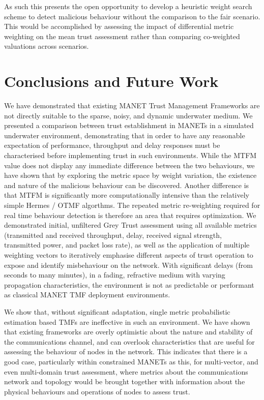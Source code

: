 As such this presents the open opportunity to develop a heuristic weight search scheme to detect malicious behaviour without the comparison to the fair scenario.
This would be accomplished by assessing the impact of differential metric weighting on the mean trust assessment rather than comparing co-weighted valuations across scenarios.


\section{Conclusions and Future Work}
We have demonstrated that existing MANET Trust Management Frameworks are not directly suitable to the sparse, noisy, and dynamic underwater medium.
We presented a comparison between trust establishment in MANETs in a simulated underwater environment, demonstrating that in order to have any reasonable expectation of performance, throughput and delay responses must be characterised before implementing trust in such environments. 
While the MTFM value does not display any immediate difference between the two behaviours, we have shown that by exploring the metric space by weight variation, the existence and nature of the malicious behaviour can be discovered.
Another difference is that MTFM is significantly more computationally intensive than the relatively simple Hermes / OTMF algorthms.
The repeated metric re-weighting required for real time behaviour detection is therefore an area that requires optimization.
We demonstrated initial, unfiltered Grey Trust assessment using all available metrics (transmitted and received throughput, delay, received signal strength, transmitted power, and packet loss rate), as well as the application of multiple weighting vectors to iteratively emphasise different aspects of trust operation to expose and identify misbehaviour on the network.
With significant delays (from seconds to many minutes), in a fading, refractive medium with varying propagation characteristics, the environment is not as predictable or performant as classical MANET TMF deployment environments.

We show that, without significant adaptation, single metric probabilistic estimation based TMFs are ineffective in such an environment.
We have shown that existing frameworks are overly optimistic about the nature and stability of the communications channel, and can overlook characteristics that are useful for assessing the behaviour of nodes in the network. 
This indicates that there is a good case, particularly within constrained MANETs as this, for multi-vector, and even multi-domain trust assessment, where metrics about the communications network and topology would be brought together with information about the physical behaviours and operations of nodes to assess trust.

